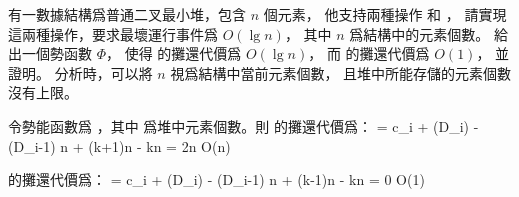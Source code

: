 \startEXERCISE
有一數據結構爲普通二叉最小堆，包含 $n$ 個元素，
他支持兩種操作  和 ，
請實現這兩種操作，要求最壞運行事件爲 $O(\lg n)$，
其中 $n$ 爲結構中的元素個數。
給出一個勢函數 $\Phi$，
使得  的攤還代價爲 $O(\lg n)$，
而  的攤還代價爲 $O(1)$，
並證明。
分析時，可以將 $n$ 視爲結構中當前元素個數，
且堆中所能存儲的元素個數沒有上限。
\stopEXERCISE

\startANSWER
令勢能函數爲 ，其中  爲堆中元素個數。則  的攤還代價爲：
\startformula
{} = c_i + \Phi(D_i) - \Phi(D_{i-1}) \le \lg n + (k+1)\lg n - k\lg n = 2\lg n \in O(\lg n)
\stopformula

 的攤還代價爲：
\startformula
{} = c_i + \Phi(D_i) - \Phi(D_{i-1}) \le \lg n + (k-1)\lg n - k\lg n = 0 \in O(1)
\stopformula
\stopANSWER
